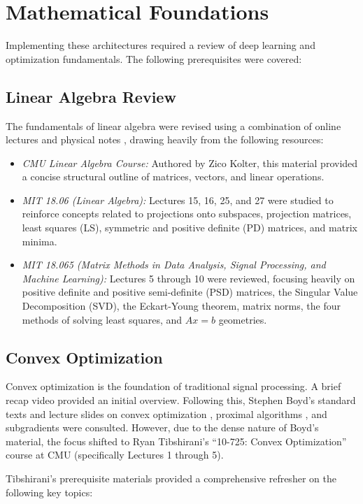 \documentclass[conference]{IEEEtran}
\begin{document}
\section{Mathematical Foundations}
Implementing these architectures required a review of deep learning and optimization fundamentals. The following prerequisites were covered:

\subsection{Linear Algebra Review}
The fundamentals of linear algebra were revised using a combination of online lectures and physical notes \cite{matrixcookbook}, drawing heavily from the following resources:
\begin{itemize}
    \item \textit{CMU Linear Algebra Course:} Authored by Zico Kolter, this material provided a concise structural outline of matrices, vectors, and linear operations.
    \item \textit{MIT 18.06 (Linear Algebra):} Lectures 15, 16, 25, and 27 were studied to reinforce concepts related to projections onto subspaces, projection matrices, least squares (LS), symmetric and positive definite (PD) matrices, and matrix minima.
    \item \textit{MIT 18.065 (Matrix Methods in Data Analysis, Signal Processing, and Machine Learning):} Lectures 5 through 10 were reviewed, focusing heavily on positive definite and positive semi-definite (PSD) matrices, the Singular Value Decomposition (SVD), the Eckart-Young theorem, matrix norms, the four methods of solving least squares, and $Ax=b$ geometries.
\end{itemize}

\subsection{Convex Optimization}
Convex optimization is the foundation of traditional signal processing. A brief recap video provided an initial overview. Following this, Stephen Boyd's standard texts and lecture slides on convex optimization \cite{boyd2004convex}, proximal algorithms \cite{parikh2014proximal}, and subgradients were consulted. However, due to the dense nature of Boyd's material, the focus shifted to Ryan Tibshirani's ``10-725: Convex Optimization'' course at CMU (specifically Lectures 1 through 5).

Tibshirani's prerequisite materials provided a comprehensive refresher on the following key topics:
\end{document}
